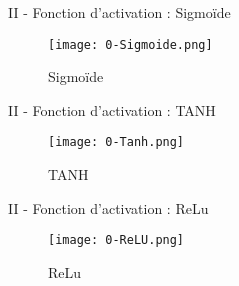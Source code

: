 \begin{frame}{II - Fonction d'activation : Sigmoïde}
	\begin{figure}
		\centering
		\texttt{[image: 0-Sigmoide.png]}
		\caption{Sigmoïde}
	\end{figure}
\end{frame}


\begin{frame}{II - Fonction d'activation : TANH}
	\begin{figure}
		\centering
		\texttt{[image: 0-Tanh.png]}
		\caption{TANH}
	\end{figure}
\end{frame}


\begin{frame}{II - Fonction d'activation : ReLu}
	\begin{figure}
		\centering
		\texttt{[image: 0-ReLU.png]}
		\caption{ReLu}
	\end{figure}
\end{frame}